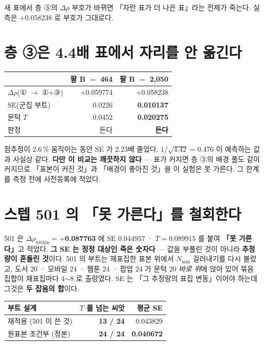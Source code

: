 \documentclass[10pt]{article}
\begin{document}
{새 표에서 층 ③의 $\Delta\rho$ 부호가 바뀌면 「자란 표가 더 나은 표」라는 전제가 죽는다.
실측은 $+$0.058238 로 부호가 그대로다.}

\section{층 ③은 4.4배 표에서 자리를 안 옮긴다}

\begin{center}\small
\begin{tabular}{lrr}
\hline
 & 팔 B $=$ 464 & 팔 B $=$ 2{,}050 \\
\hline
$\Delta\rho$(① $\to$ ①$+$③) & $+$0.059774 & $+$0.058238 \\
SE(군집 부트) & 0.0226 & \textbf{0.010137} \\
문턱 $T$ & 0.0452 & \textbf{0.020275} \\
판정 & 든다 & \textbf{든다} \\
\hline
\end{tabular}
\end{center}

점추정이 2.6\,\% 움직이는 동안 SE 가 2.23배 줄었다. $1/\sqrt{4.42}=0.476$ 이 예측하는
값과 사실상 같다. \textbf{다만 이 비교는 깨끗하지 않다} --- 표가 커지면 층 ③의 배경 풀도
같이 커지므로 「표본이 커진 것」과 「배경이 좋아진 것」을 이 실험은 못 가른다. 그 한계를
측정 전에 사전등록에 적었다.

\section{스텝 501 의 「못 가른다」를 철회한다}

501 은 \textbf{$\Delta\rho_{\text{within}}=+$0.087763} 에 SE $0.044957$ · $T=0.089915$ 를
붙여 \textbf{「못 가른다」}고 적었다. \textbf{그 SE 는 정정 대상인 죽은 숫자다} ---
값을 부풀린 것이 아니라 \textbf{추정량이 흔들린 것}이다. 501 의 부트는 재표집한 표본 위에서
$N_{\min}$ 걸러내기를 다시 불렀고, 도서 20 · 모바일 24 · 웹툰 24 · 팝업 24 가 문턱 20
\emph{바로 위}에 앉아 있어 묶음 집합이 재표집마다 4$\sim$8 로 출렁였다. SE 는 「그 추정량의
표집 변동」이어야 하는데 그것은 \textbf{두 잡음의 합}이다.

\begin{center}\small
\begin{tabular}{lrr}
\hline
부트 설계 & $T$ 를 넘는 씨앗 & 평균 SE \\
\hline
재적용 (501 이 쓴 것) & \textbf{13 / 24} & 0.043829 \\
원표본 조건부 (정본) & \textbf{24 / 24} & \textbf{0.040672} \\
\hline
\end{tabular}
\end{center}
\end{document}
